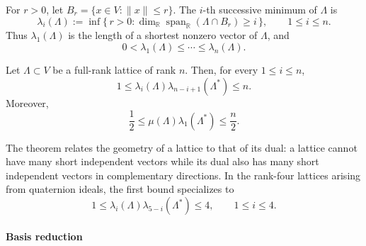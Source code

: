 For \(r>0\), let $B_r=\{x\in V:\|x\|\le r\}$.
The \(i\)-th successive minimum of \(\Lambda\) is
\[
    \lambda_i(\Lambda)
    :=
    \inf\{\, r>0 :
    \dim_{\mathbb R}\operatorname{span}_{\mathbb R}(\Lambda\cap B_r)
    \ge i \,\},
    \qquad 1\le i\le n.
\]
Thus \(\lambda_1(\Lambda)\) is the length of a shortest nonzero vector of
\(\Lambda\), and
\[
    0<\lambda_1(\Lambda)\le \cdots \le \lambda_n(\Lambda).
\]

\begin{lemma}
\label{lem:transference}
Let \(\Lambda\subset V\) be a full-rank lattice of rank \(n\).  Then, for
every \(1\le i\le n\),
\[
    1
    \le
    \lambda_i(\Lambda)\lambda_{n-i+1}(\Lambda^\ast)
    \le
    n.
\]
Moreover,
\[
    \frac12
    \le
    \mu(\Lambda)\lambda_1(\Lambda^\ast)
    \le
    \frac n2.
\]
\end{lemma}

The theorem relates the geometry of a lattice to that of its dual: a lattice
cannot have many short independent vectors while its dual also has many short
independent vectors in complementary directions.  In the rank-four lattices
arising from quaternion ideals, the first bound specializes to
\[
    1
    \le
    \lambda_i(\Lambda)\lambda_{5-i}(\Lambda^\ast)
    \le
    4,
    \qquad 1\le i\le 4.
\]

\paragraph{Basis reduction}

